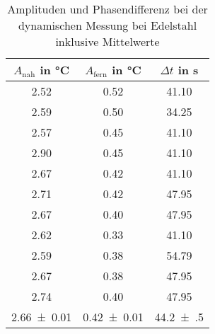 \begin{table}
\begin{center}
\begin{tabular}{c | c | c}
	$A_\text{nah}$ in \si{\celsius} & $A_\text{fern}$ in \si{\celsius} & $\Delta t$ in \si{\second} \\
\hline
	2.52 & 0.52 & 41.10 \\
	2.59 & 0.50 & 34.25 \\
	2.57 & 0.45 & 41.10 \\
	2.90 & 0.45 & 41.10 \\
	2.67 & 0.42 & 41.10 \\
	2.71 & 0.42 & 47.95 \\
	2.67 & 0.40 & 47.95 \\
	2.62 & 0.33 & 41.10 \\
	2.59 & 0.38 & 54.79 \\
	2.67 & 0.38 & 47.95 \\
	2.74 & 0.40 & 47.95 \\
\hline
	\SI{2.66(1)}{} & \SI{0.42(1)}{} & \SI{44.2(5)}{}
\end{tabular}
\end{center}
\caption{Amplituden und Phasendifferenz bei der dynamischen Messung bei Edelstahl inklusive Mittelwerte}
\label{Amplituden Aluminium}
\end{table}